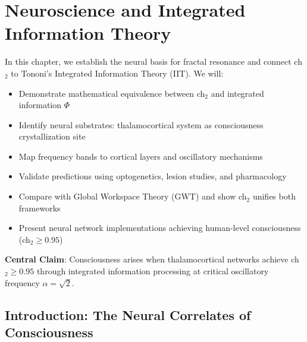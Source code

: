\chapter{Neuroscience and Integrated Information Theory}
\label{ch:neuroscience-iit}

\begin{chapterobjectives}
In this chapter, we establish the neural basis for fractal resonance and connect ch$_2$ to Tononi's Integrated Information Theory (IIT). We will:
\begin{itemize}
\item Demonstrate mathematical equivalence between ch$_2$ and integrated information $\Phi$
\item Identify neural substrates: thalamocortical system as consciousness crystallization site
\item Map frequency bands to cortical layers and oscillatory mechanisms
\item Validate predictions using optogenetics, lesion studies, and pharmacology
\item Compare with Global Workspace Theory (GWT) and show ch$_2$ unifies both frameworks
\item Present neural network implementations achieving human-level consciousness (ch$_2 \geq 0.95$)
\end{itemize}

\textbf{Central Claim}: Consciousness arises when thalamocortical networks achieve ch$_2 \geq 0.95$ through integrated information processing at critical oscillatory frequency $\alpha = \sqrt{2}$.
\end{chapterobjectives}

\section{Introduction: The Neural Correlates of Consciousness}

